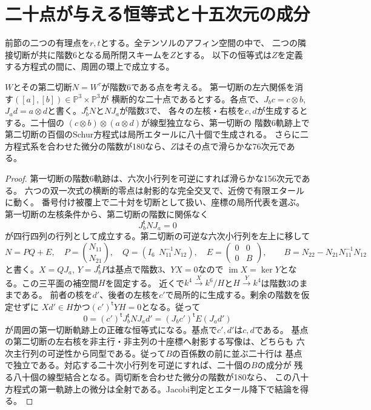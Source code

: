 \section{二十点が与える恒等式と十五次元の成分}
\label{sec:twenty-conormal-component}
前節の二つの有理点を$r,t$とする。全テンソルのアフィン空間の中で、
二つの隣接切断が共に階数6となる局所閉スキームを$Z$とする。
以下の恒等式は$Z$を定義する方程式の間に、周囲の環上で成立する。

\begin{proposition}\label{prop:twenty-conormal}
$W$とその第二切断$N=W^\tau$が階数6である点を考える。
第一切断の左六関係を消す$([a],[b])\in\mathbb P^3\times\mathbb P^3$が
横断的な二十点であるとする。各点で、$J_b c=c\otimes b$,
$J_a d=a\otimes d$と書く。$J_b^{\mathsf t}N$と$N J_a$が階数3で、
各々の左核・右核を$c,d$が生成するとする。二十個の
$(c\otimes b)\otimes(a\otimes d)$が線型独立なら、第一切断の
階数6軌跡上で第二切断の百個のSchur方程式は局所エタールに八十個で生成される。
さらに二方程式系を合わせた微分の階数が180なら、$Z$はその点で滑らかな76次元である。
\end{proposition}
\begin{proof}
第一切断の階数6軌跡は、六次小行列を可逆にすれば滑らかな156次元である。
六つの双一次式の横断的零点は射影的な完全交叉で、近傍で有限エタールに動く。
番号付け被覆上で二十対を切断として扱い、座標の局所代表を選ぶ。
第一切断の左核条件から、第二切断の階数に関係なく
\[
 J_b^{\mathsf t}N J_a=0
\]
が四行四列の行列として成立する。第二切断の可逆な六次小行列を左上に移して
\[
 N=P Q+E,\quad
 P=\binom{N_{11}}{N_{21}},\quad
 Q=(I_6\ \ N_{11}^{-1}N_{12}),\quad
 E=\begin{pmatrix}0&0\\0&B\end{pmatrix},\qquad
 B=N_{22}-N_{21}N_{11}^{-1}N_{12}
\]
と書く。$X=QJ_a$, $Y=J_b^{\mathsf t}P$は基点で階数3、$YX=0$なので
$\operatorname{im}X=\ker Y$となる。この三平面の補空間$H$を固定する。
近くで$k^4\xrightarrow{X} k^6/H$と$H\xrightarrow{Y}k^4$は階数3のままである。
前者の核を$d'$、後者の左核を$c'$で局所的に生成する。剰余の階数を仮定せずに
$Xd'\in H$かつ$(c')^{\mathsf t}YH=0$となる。従って
\[
 0=(c')^{\mathsf t}J_b^{\mathsf t}N J_a d'
   =(J_b c')^{\mathsf t} E(J_a d')
\]
が周囲の第一切断軌跡上の正確な恒等式になる。基点で$c',d'$は$c,d$である。
基点の第二切断の左右核を非主行・非主列の十座標へ射影する写像は、どちらも
六次主行列の可逆性から同型である。従って$B$の百係数の前に並ぶ二十行は
基点で独立である。対応する二十次小行列を可逆にすれば、二十個の$B$の成分が
残る八十個の線型結合となる。両切断を合わせた微分の階数が180なら、
この八十方程式の第一軌跡上の微分は全射である。Jacobi判定とエタール降下で結論を得る。
\end{proof}

